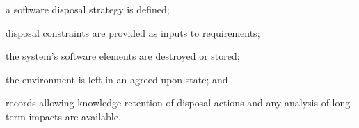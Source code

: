 			\begin{adjustwidth}{2em}{0pt} 

				\begin{compactitem}

					\item a software disposal strategy is defined;

					\item disposal constraints are provided as inputs to requirements;

					\item the system's software elements are destroyed or stored;

					\item the environment is left in an agreed-upon state; and

					\item records allowing knowledge retention of disposal actions and any analysis of long-term impacts are available.

				\end{compactitem}

			\end{adjustwidth}

